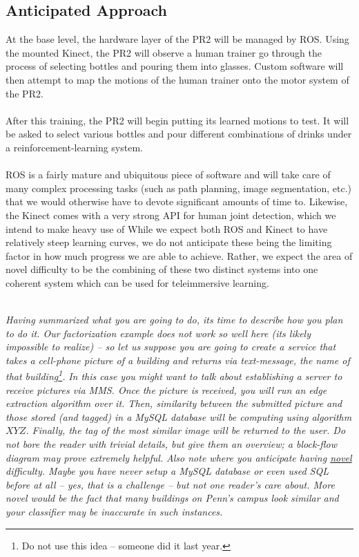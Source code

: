 \documentclass{sig-alternate}
\begin{document}
\subsection{Anticipated Approach}
\label{subsec:approach}
At the base level, the hardware layer of the PR2 will be managed by ROS.
Using the mounted Kinect, the PR2 will observe a human trainer go
through the process of selecting bottles and pouring them into glasses. Custom 
software will then attempt to map the motions of the human trainer onto the 
motor system of the PR2.
\\
\\After this training, the PR2 will begin putting its learned motions to test.
It will be asked to select various bottles and  pour different combinations of
drinks under a reinforcement-learning system.
\\
\\ROS is a fairly mature and ubiquitous piece of software and will take care of
many complex processing tasks (such as path planning, image segmentation, etc.)
that we would otherwise have to devote significant amounts of time to.  
Likewise, the Kinect comes with a very strong API for human joint detection,
which we intend to make heavy use of
While we expect both ROS and Kinect to have relatively steep learning curves,
we do not anticipate these being the limiting factor in how much progress we
are able to achieve. 
Rather, we expect the area of novel difficulty to be the combining of these
two distinct systems into one coherent system which can be used for
teleimmersive learning.

\\\emph{Having summarized \textit{what} you are going to do, its time to describe \textit{how} you plan to do it. Our factorization example does not work so well here (its likely impossible to realize) -- so let us suppose you are going to create a service that takes a cell-phone picture of a building and returns via text-message, the name of that building\footnote{Do not use this idea -- someone did it last year.}.}
\emph{
In this case you might want to talk about establishing a server to receive pictures via MMS. Once the picture is received, you will run an edge extraction algorithm over it. Then, similarity between the submitted picture and those stored (and tagged) in a MySQL database will be computing using algorithm $XYZ$. Finally, the tag of the most similar image will be returned to the user. Do not bore the reader with trivial details, but give them an overview; a block-flow diagram may prove extremely helpful.}
\emph{
Also note where you anticipate having \underline{novel} difficulty. Maybe you have never setup a MySQL database or even used SQL before at all -- yes, that is a challenge -- but not one reader's care about. More novel would be the fact that many buildings on Penn's campus look similar and your classifier may be inaccurate in such instances.}
\end{document}
